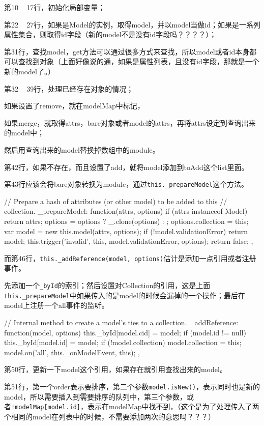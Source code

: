 第10 ~ 17行，初始化局部变量；

第22 ~ 27行，如果是Model的实例，取得model，并以model当做id；如果是一系列属性集合，则取得id字段（新的model不是没有id字段吗？？？？）；

第31行，查找model，get方法可以通过很多方式来查找，所以model或者id本身都可以查找到对象（上面好像说的通，如果是属性列表，且没有id字段，那就是一个新的model了。）

第32 ~ 39行，处理已经存在对象的情况；

如果设置了remove，就在modelMap中标记，

如果merge，就取得attrs，bare对象或者model的attrs，再将attrs设定到查询出来的model中；

然后用查询出来的model替换掉数组中的module。

第42行，如果不存在，而且设置了add，就将model添加到toAdd这个list里面。

第43行应该会将bare对象转换为module，通过\lstinline$this._prepareModel$这个方法。

\begin{JavaScript}
    // Prepare a hash of attributes (or other model) to be added to this
    // collection.
    _prepareModel: function(attrs, options) {
      if (attrs instanceof Model) return attrs;
      options = options ? _.clone(options) : {};
      options.collection = this;
      var model = new this.model(attrs, options);
      if (!model.validationError) return model;
      this.trigger('invalid', this, model.validationError, options);
      return false;
    },
\end{JavaScript}

而第46行，\lstinline$this._addReference(model, options)$估计是添加一点引用或者注册事件。

先添加一个\lstinline$_byId$的索引；然后设置对Collection的引用，这是上面\lstinline$this._prepareModel$中如果传入的是model的时候会漏掉的一个操作；最后在model上注册一个all事件的监听。

\begin{JavaScript}
    // Internal method to create a model's ties to a collection.
    _addReference: function(model, options) {
      this._byId[model.cid] = model;
      if (model.id != null) this._byId[model.id] = model;
      if (!model.collection) model.collection = this;
      model.on('all', this._onModelEvent, this);
    },
\end{JavaScript}


第50行，更新一下model这个引用，如果存在就引用查找出来的model。

第51行，第一个order表示要排序，第二个参数\lstinline$model.isNew()$，表示同时也是新的model，所以需要插入到需要排序的队列中，第三个参数，或者\lstinline$!modelMap[model.id]$，表示在modelMap中找不到，（这个是为了处理传入了两个相同的model在列表中的时候，不需要添加两次的意思吗？？？）

